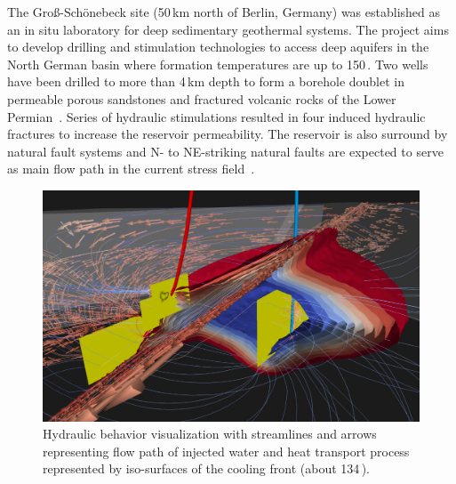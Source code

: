 \documentclass[twocolumn]{svjour3}          %
\begin{document}
The Gro{\ss}-Sch\"onebeck site (50\,km north of Berlin, Germany) was established as an in situ laboratory for deep sedimentary geothermal systems. The project aims to develop drilling and stimulation technologies to access deep aquifers in the North German basin where formation temperatures are up to 150\,\celsius. Two wells have been drilled to more than 4\,km depth to form a borehole doublet in permeable porous sandstones and fractured volcanic rocks of the Lower Permian~\cite{zimmermann:geothermal}. Series of hydraulic stimulations resulted in four induced hydraulic fractures to increase the reservoir permeability. The reservoir is also surround by natural fault systems and N- to NE-striking natural faults are expected to serve as main flow path in the current stress field~\cite{bloecher:geothermal}.

\begin{figure}[htb]
  \includegraphics[width=\linewidth]{images/geothermal.jpg}
\caption{Hydraulic behavior visualization with streamlines and arrows representing flow path of injected water and heat transport process represented by iso-surfaces of the cooling front (about 134\,\celsius).}
\label{fig:geothermal}
\end{figure}
\end{document}
